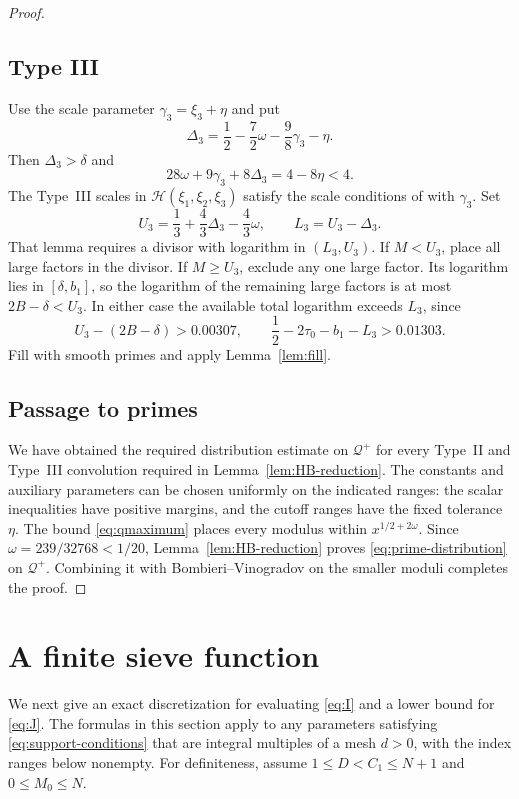 \documentclass[11pt,reqno]{amsart}
\theoremstyle{definition}
\theoremstyle{remark}
\numberwithin{equation}{section}
\newcommand{\Qset}{\mathcal Q}
\newcommand{\HH}{\mathcal H}
\newcommand{\tmax}{\tau_0}
\begin{document}
\begin{proof}
\subsection*{Type III}
Use the scale parameter $\gamma_3=\xi_3+\eta$ and put
\begin{equation}\label{eq:III-delta}
 \Delta_3=\frac12-\frac72\omega-\frac98\gamma_3-\eta.
\end{equation}
Then $\Delta_3>\delta$ and
\[
 28\omega+9\gamma_3+8\Delta_3=4-8\eta<4.
\]
The Type~III scales in $\HH(\xi_1,\xi_2,\xi_3)$ satisfy the scale
conditions of \cite[Lemma~7]{Stadlmann26} with $\gamma_3$.
Set
\begin{equation}\label{eq:III-window}
 U_3=\frac13+\frac43\Delta_3-\frac43\omega,\qquad L_3=U_3-\Delta_3.
\end{equation}
That lemma requires a divisor with logarithm in $(L_3,U_3)$.
If $M<U_3$, place all large factors in the divisor. If $M\ge U_3$,
exclude any one large factor. Its logarithm lies in $[\delta,b_1]$, so
the logarithm of the remaining large factors is at most $2B-\delta<U_3$.
In either case the available total logarithm exceeds $L_3$, since
\begin{equation}\label{eq:III-cap}
 U_3-(2B-\delta)>0.00307,\qquad
 \frac12-2\tmax-b_1-L_3>0.01303.
\end{equation}
Fill with smooth primes and apply Lemma~\ref{lem:fill}.

\subsection*{Passage to primes}
We have obtained the required distribution estimate on $\Qset^+$ for
every Type~II and Type~III convolution required in
Lemma~\ref{lem:HB-reduction}. The constants and auxiliary parameters can
be chosen uniformly on the indicated ranges: the scalar inequalities
have positive margins, and the cutoff ranges have the fixed tolerance
$\eta$. The bound \eqref{eq:qmaximum} places every modulus within
$x^{1/2+2\omega}$. Since $\omega=239/32768<1/20$,
Lemma~\ref{lem:HB-reduction} proves \eqref{eq:prime-distribution} on
$\Qset^+$.
Combining it with Bombieri--Vinogradov on the smaller moduli completes
the proof.
\end{proof}

\section{A finite sieve function}\label{sec:discrete}
We next give an exact discretization for evaluating \eqref{eq:I} and a
lower bound for \eqref{eq:J}. The formulas in this section apply to any
parameters satisfying \eqref{eq:support-conditions} that are integral
multiples of a mesh $d>0$, with the index ranges below nonempty.
For definiteness, assume $1\le D<C_1\le N+1$ and $0\le M_0\le N$.
\end{document}
